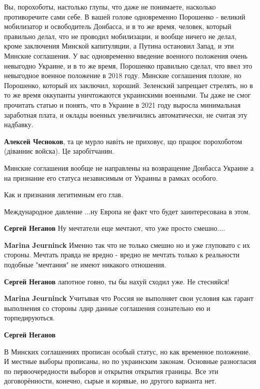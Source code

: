 \begin{itemize}
\begin{itemize}
Вы, порохоботы, настолько глупы, что даже не понимаете, насколько противоречите
сами себе. В вашей голове одновременно Порошенко - великий мобилизатор и
освободитель Донбасса, и в то же время, человек, который правильно делал, что
не проводил мобилизации, и вообще ничего не делал, кроме заключения Минской
капитуляции, а Путина остановил Запад, и эти Минские соглашения. У вас
одновременно введение военного положения очень невыгодно Украине, и в то же
время, Порошенко правильно сделал, что ввел это невыгодное военное положение в
2018 году. Минские соглашения плохие, но Порошенко, который их заключил,
хороший. Зеленский запрещает стрелять, но в то же время оккупанты уничтожаются
украинскими военными. Ты даже не смог прочитать статью и понять, что в Украине
в 2021 году выросла минимальная заработная плата, и оклады военных увеличились
автоматически, не считая эту надбавку.


\textbf{Алексей Чесноков}, та це мурло навіть не приховує, що працює порохоботом (діванниє войска). Це заробітчанин.

\end{itemize} %


Минские соглашения вообще не направлены на возвращение Донбасса Украине а на
признание его статуса независимым от Украины в рамках особого.

Как и признания легитимным его глав.

Международное давление ...ну Европа не факт что будет заинтересована в этом.

\begin{itemize} %
\textbf{Сергей Неганов} Ну мечтатели еще мечтают, что уже просто смешно....

\textbf{Marina Jeurninck} Именно так что не только смешно но и уже глуповато с их стороны.
Мечтать правда не вредно - вредно не мечтать только к реальности подобные "мечтания" не имеют никакого отношения.

\textbf{Сергей Неганов} лапотное говно, ты бы нахуй сходил уже. Не стесняйся!

\textbf{Marina Jeurninck} Учитывая что Россия не выполняет свои условия как гарант выполнения со стороны лднр данные соглашения сознательно ею и торпедируються.

\textbf{Сергей Неганов} 

В Минских соглашениях прописан особый статус, но как временное положение. И
местные выборы прописаны, но по украинским законам. Основные разногласия по
первоочередности выборов и открытия открытия границы. Все эти договорённости,
конечно, сырые и корявые, но другого варианта нет.



\end{itemize}
\end{itemize}
